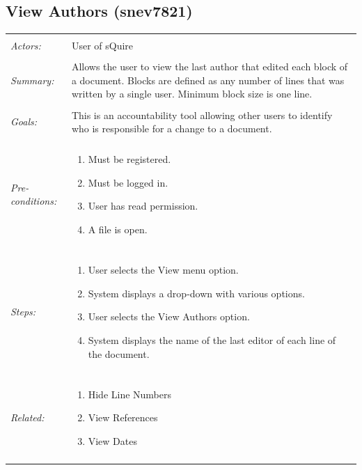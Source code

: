 \documentclass[11pt]{report}
\begin{document}
\subsection{View Authors (snev7821)}
\begin{tabular}{ p{2cm} p{12cm} }
\hline
\\
	\textit{Actors:} & User of sQuire \\
	\\
	\textit{Summary:} & Allows the user to view the last author that edited each block of a document. Blocks are defined as any number of lines that was written by a single user. Minimum block size is one line. \\
	\\
	\textit{Goals:} & This is an accountability tool allowing other users to identify who is responsible for a change to a document. \\
	\\
	\textit{Pre-conditions:} & 
	\begin{enumerate}
		\item Must be registered.
		\item Must be logged in.
		\item User has read permission.
		\item A file is open.
	\end{enumerate} \\
	\\
	\textit{Steps:} & \begin{enumerate}
		\item User selects the View menu option.
		\item System displays a drop-down with various options.
		\item User selects the View Authors option.
		\item System displays the name of the last editor of each line of the document.
	\end{enumerate} \\
	\\
	\textit{Related:} & \begin{enumerate}
		\item Hide Line Numbers
		\item View References
		\item View Dates
	\end{enumerate} \\
	\\
\hline
\end{tabular}
\newpage
\end{document}
